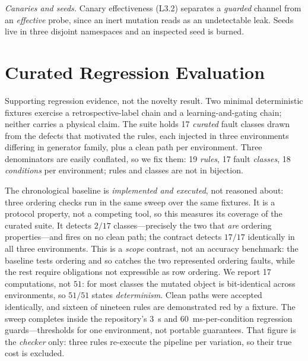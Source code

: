 \documentclass[conference]{IEEEtran}
\newcommand{\rulename}[1]{\textsf{#1}}
\newcommand{\artv}[2]{#2}
\begin{document}
\emph{Canaries and seeds.} Canary effectiveness (\rulename{L3.2}) separates a \emph{guarded} channel from an \emph{effective} probe, since an inert mutation reads as an undetectable leak. Seeds live in three disjoint namespaces and an inspected seed is burned.

\section{Curated Regression Evaluation}
\label{sec:eval}

Supporting regression evidence, not the novelty result. Two minimal deterministic fixtures exercise a
retrospective-label chain and a learning-and-gating chain; neither carries a physical claim. The
suite holds
\artv{fault_class_count}{\num{17}} \emph{curated} fault classes drawn from the defects that
motivated the rules, each injected in three environments differing in generator family, plus a clean
path per environment. Three denominators are easily conflated, so we fix them:
\artv{rule_count}{\num{19}} \emph{rules}, \artv{fault_class_count}{\num{17}} fault \emph{classes}, \artv{conditions}{\num{18}}
\emph{conditions} per environment; rules and classes are not in bijection.

The chronological baseline is \emph{implemented and executed}, not reasoned about: three ordering
checks run in the same sweep over the same fixtures. It is a protocol property, not a competing
tool, so this measures its coverage of the curated suite. It detects
$\artv{chronological}{2/17}$ classes---precisely the two that \emph{are} ordering
properties---and fires on no clean path; the contract detects $\artv{contract}{17/17}$ identically
in all three environments. This is a \emph{scope} contrast, not an accuracy benchmark: the baseline
tests ordering and so catches the two represented ordering faults, while the rest require
obligations not expressible as row ordering. We report \artv{fault_class_count}{\num{17}} computations, not $51$: for most
classes the mutated object is bit-identical across environments, so
$\artv{injected_cells}{51/51}$ states \emph{determinism}. Clean paths were accepted identically, and \artv{red_fixture}{sixteen} of nineteen rules are demonstrated red by a
fixture. The sweep completes inside the repository's \qty{\artv{rt_s}{3}}{\second} and
\qty{\artv{rt_ms}{60}}{\milli\second}-per-condition regression guards---thresholds for one
environment, not portable guarantees. That figure is the \emph{checker} only: three rules
re-execute the pipeline per variation, so their true cost is excluded.
\end{document}

